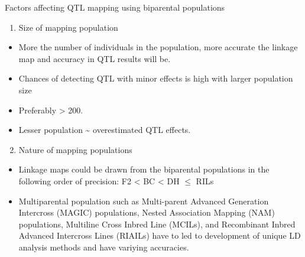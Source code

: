 \documentclass[
  ignorenonframetext,
  aspectratio=169]{beamer}
\providecommand{\tightlist}{%
  \setlength{\itemsep}{0pt}\setlength{\parskip}{0pt}}
\begin{document}
\begin{frame}{Factors affecting QTL mapping using biparental
populations}
\protect\hypertarget{factors-affecting-qtl-mapping-using-biparental-populations}{}
\footnotesize

\begin{enumerate}
\tightlist
\item
  Size of mapping population
\end{enumerate}

\begin{itemize}
\tightlist
\item
  More the number of individuals in the population, more accurate the
  linkage map and accuracy in QTL results will be.
\item
  Chances of detecting QTL with minor effects is high with larger
  population size
\item
  Preferably \textgreater{} 200.
\item
  Lesser population \textasciitilde{} overestimated QTL effects.
\end{itemize}

\begin{enumerate}
\setcounter{enumi}{1}
\tightlist
\item
  Nature of mapping populations
\end{enumerate}

\begin{itemize}
\tightlist
\item
  Linkage maps could be drawn from the biparental populations in the
  following order of precision: F2 \textless{} BC \textless{} DH
  \(\leq\) RILs
\item
  Multiparental population such as Multi-parent Advanced Generation
  Intercross (MAGIC) populations, Nested Association Mapping (NAM)
  populations, Multiline Cross Inbred Line (MCILs), and Recombinant
  Inbred Advanced Intercross Lines (RIAILs) have to led to development
  of unique LD analysis methods and have variying accuracies.
\end{itemize}
\end{frame}
\end{document}
